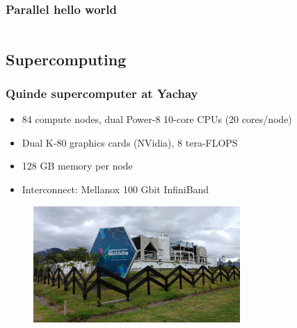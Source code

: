 \documentclass[usenames,dvipsnames,mathserif,compress]{beamer}
\begin{document}
\begin{frame}[fragile]
  \frametitle{Parallel hello world}
  
\end{frame}

\begin{frame}[fragile]
  \begin{columns}
    \begin{column}{1.05\textwidth}
  
    \end{column}
  \end{columns}
\end{frame}

\subsection*{Supercomputing}


\begin{frame}
  \frametitle{Quinde supercomputer at Yachay}
  \begin{itemize}
  \item 84 compute nodes, dual Power-8 10-core CPUs (20 cores/node)
  \item Dual K-80 graphics cards (NVidia), 8 tera-FLOPS
  \item 128 GB memory per node
  \item Interconnect: Mellanox 100 Gbit InfiniBand
  \end{itemize}
  \vspace{-5mm}
  \begin{figure}
  \includegraphics[width=0.7\textwidth]{quinde.jpg}
  \end{figure}
\end{frame}
\end{document}
